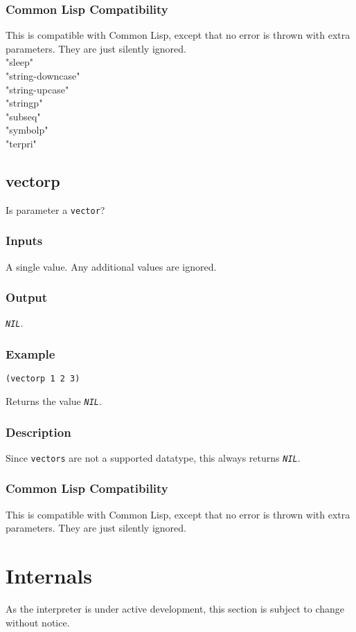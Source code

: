 \documentclass[10pt, openany]{book}
\newcommand{\constant}[1]{\emph{\texttt{#1}}}
\newcommand{\datatype}[1]{\texttt{#1}}
\newcommand{\cl}{Common Lisp}
\begin{document}
\subsection{Common Lisp Compatibility}
This is compatible with \cl, except that no error is thrown with extra parameters.  They are just silently ignored.
\\
      "sleep"\\
      "string-downcase"\\
      "string-upcase"\\
      "stringp"\\
      "subseq"\\
      "symbolp"\\
      "terpri"\\

\section{vectorp}
Is parameter a \datatype{vector}?
\subsection{Inputs}
A single value.  Any additional values are ignored.
\subsection{Output}
\constant{NIL}.
\subsection{Example}
\begin{lstlisting}
(vectorp 1 2 3)
\end{lstlisting}
Returns the value \constant{NIL}.
\subsection{Description}
Since \datatype{vectors} are not a supported datatype, this always returns \constant{NIL}.
\subsection{Common Lisp Compatibility}
This is compatible with \cl, except that no error is thrown with extra parameters.  They are just silently ignored.
\chapter{Internals}
As the interpreter is under active development, this section is subject to change without notice.
\end{document}

